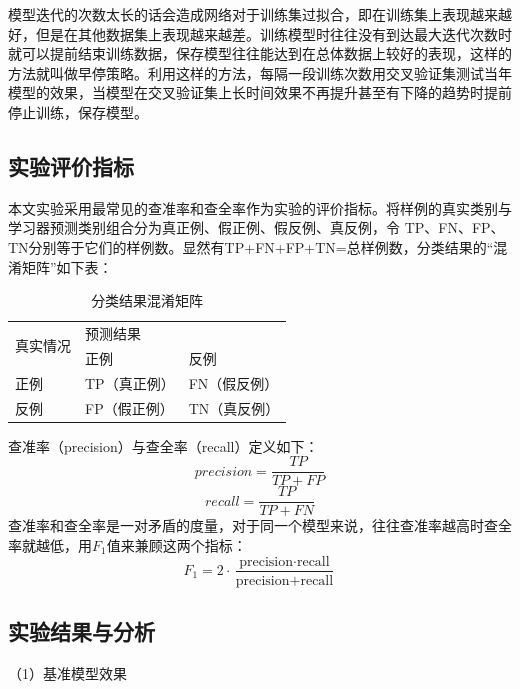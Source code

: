 \documentclass[winfonts,master,oneside,nobackinfo]{njuthesis}
\begin{document}
模型迭代的次数太长的话会造成网络对于训练集过拟合，即在训练集上表现越来越好，但是在其他数据集上表现越来越差。训练模型时往往没有到达最大迭代次数时就可以提前结束训练数据，保存模型往往能达到在总体数据上较好的表现，这样的方法就叫做早停策略。利用这样的方法，每隔一段训练次数用交叉验证集测试当年模型的效果，当模型在交叉验证集上长时间效果不再提升甚至有下降的趋势时提前停止训练，保存模型。

\subsection{实验评价指标}

本文实验采用最常见的查准率和查全率作为实验的评价指标。将样例的真实类别与学习器预测类别组合分为真正例、假正例、假反例、真反例，令
TP、FN、FP、TN分别等于它们的样例数。显然有TP+FN+FP+TN=总样例数，分类结果的“混淆矩阵”如下表：

\begin{table}[H]
\centering
\begin{tabular}{|l|l|l|}
\hline
\multirow{2}{*}{真实情况} & \multicolumn{2}{l|}{预测结果} \\ \cline{2-3} 
                      & 正例          & 反例          \\ \hline
正例                    & TP（真正例）     & FN（假反例）     \\ \hline
反例                    & FP（假正例）     & TN（真反例）     \\ \hline
\end{tabular}
\caption{分类结果混淆矩阵}
\end{table}


查准率（precision）与查全率（recall）定义如下：
\begin{equation}
precision =\frac{T P}{T P+F P}
\end{equation}
\begin{equation}
recall=\frac{T P}{T P+F N}
\end{equation}
查准率和查全率是一对矛盾的度量，对于同一个模型来说，往往查准率越高时查全率就越低，用$F_{1}$值来兼顾这两个指标：
\begin{equation}
F_{1}=2 \cdot \frac{\text {precision} \cdot \text {recall}}{\text {precision}+\text {recall}}
\end{equation}
\subsection{实验结果与分析}

（1）基准模型效果
\end{document}
